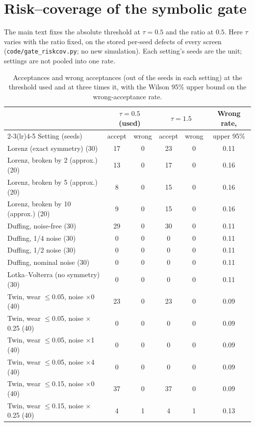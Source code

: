 \section{Risk--coverage of the symbolic gate}\label{app:riskcov}
The main text fixes the absolute threshold at $\tau=0.5$ and the ratio at $0.5$. Here $\tau$ varies with the ratio fixed, on the stored per-seed defects of every screen (\texttt{code/\allowbreak gate\_\allowbreak riskcov.py}; no new simulation). Each setting's seeds are the unit; settings are not pooled into one rate.
\begin{table}[H]\centering\small
\caption{Acceptances and wrong acceptances (out of the seeds in each setting) at the threshold used and at three times it, with the Wilson 95\% upper bound on the wrong-acceptance rate.}\label{tab:riskcov}
\begin{tabular}{@{}lccccc@{}}
\toprule
 & \multicolumn{2}{c}{$\tau=0.5$ (used)} & \multicolumn{2}{c}{$\tau=1.5$} & Wrong rate,\\
\cmidrule(lr){2-3}\cmidrule(lr){4-5}
Setting (seeds) & accept & wrong & accept & wrong & upper 95\%\\
\midrule
Lorenz (exact symmetry) (30) & 17 & 0 & 23 & 0 & 0.11\\
Lorenz, broken by 2 (approx.) (20) & 13 & 0 & 17 & 0 & 0.16\\
Lorenz, broken by 5 (approx.) (20) & 8 & 0 & 15 & 0 & 0.16\\
Lorenz, broken by 10 (approx.) (20) & 9 & 0 & 15 & 0 & 0.16\\
Duffing, noise-free (30) & 29 & 0 & 30 & 0 & 0.11\\
Duffing, 1/4 noise (30) & 0 & 0 & 0 & 0 & 0.11\\
Duffing, 1/2 noise (30) & 0 & 0 & 0 & 0 & 0.11\\
Duffing, nominal noise (30) & 0 & 0 & 0 & 0 & 0.11\\
Lotka--Volterra (no symmetry) (30) & 0 & 0 & 0 & 0 & 0.11\\
Twin, wear $\le$0.05, noise $\times$0 (40) & 23 & 0 & 23 & 0 & 0.09\\
Twin, wear $\le$0.05, noise $\times$0.25 (40) & 0 & 0 & 0 & 0 & 0.09\\
Twin, wear $\le$0.05, noise $\times$1 (40) & 0 & 0 & 0 & 0 & 0.09\\
Twin, wear $\le$0.05, noise $\times$4 (40) & 0 & 0 & 0 & 0 & 0.09\\
Twin, wear $\le$0.15, noise $\times$0 (40) & 37 & 0 & 37 & 0 & 0.09\\
Twin, wear $\le$0.15, noise $\times$0.25 (40) & 4 & 1 & 4 & 1 & 0.13\\

\end{tabular}
\end{table}
